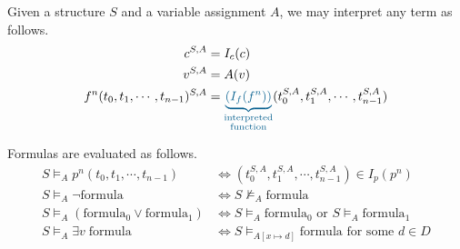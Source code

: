 Given a structure \(S\) and a variable assignment \(A\), we may interpret any term as follows.
%
\begin{align*}
    c^{S, A} &= I_c (c)\\
    v^{S, A} &= A(v)\\
    f^n (t_0, t_1, \cdots, t_{n-1})^{S, A} &= {\color{MidnightBlue} \underbrace{(I_f (f^n))}_{\substack{\text{interpreted}\\\text{function}}}} (t_0^{S, A}, t_1^{S, A}, \cdots, t_{n-1}^{S, A})
\end{align*}

Formulas are evaluated as follows.
%
\begin{align*}
    S \models_A p^n (t_0, t_1, \cdots, t_{n-1}) &\iff (t_0^{S, A}, t_1^{S, A}, \cdots, t_{n-1}^{S, A}) \in I_p (p^n)\\
    S \models_A \neg \text{formula} &\iff S \not\models_A \text{formula}\\
    S \models_A (\text{formula}_0 \lor \text{formula}_1) &\iff S \models_A \text{formula}_0 \text{ or } S \models_A \text{formula}_1\\
    S \models_A \exists v\; \text{formula} &\iff S \models_{A[x \mapsto d]} \text{formula for some } d \in D
\end{align*}

